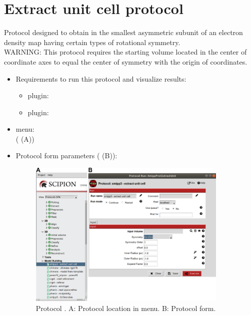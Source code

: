 \section{Extract unit cell protocol}
\label{app:extractUnitCell}%
Protocol designed to obtain in \scipion the smallest asymmetric subunit of an electron density map having certain types of rotational symmetry.\\
WARNING: This protocol requires the starting volume located in the center of coordinate axes to equal the center of symmetry with the origin of coordinates.

\begin{itemize}
  \item Requirements to run this protocol and visualize results:
    \begin{itemize}
        \item \scipion plugin: 
        \item \scipion plugin: 
    \end{itemize}
  \item \scipion menu:\\
   ( (A))
  
  \item Protocol form parameters ( (B)):
  
  \begin{figure}[H]
    \centering 
    \captionsetup{width=.7\linewidth} 
    \includegraphics[width=0.90\textwidth]{Images_appendix/Fig107.pdf}
    \caption{Protocol . A: Protocol location in \scipion menu. B: Protocol form.}
    \label{fig:app_protocol_extractUnitCell_1}
   \end{figure}
  

\end{itemize}
